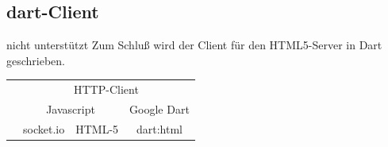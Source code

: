 \subsection{dart-Client}nicht unterstützt
Zum Schluß wird der Client für den HTML5-Server in Dart geschrieben. 

\renewcommand{\arraystretch}{1.2}

\begin{table}[!hbt]\vspace{1ex}\centering
\begin{tabular}{| l| m{2.3cm}||c|c|c|}\cline{3-5}

\multicolumn{2}{c||}{}&\multicolumn{3}{c|}{HTTP-Client}\\\cline{3-5}
\multicolumn{2}{c||}{}&\multicolumn{2}{c|}{ Javascript}& Google Dart \\\cline{3-5}
\multicolumn{2}{c||}{}& socket.io  & HTML-5 & dart:html \\\hline\hline


\end{tabular}
\end{table}
